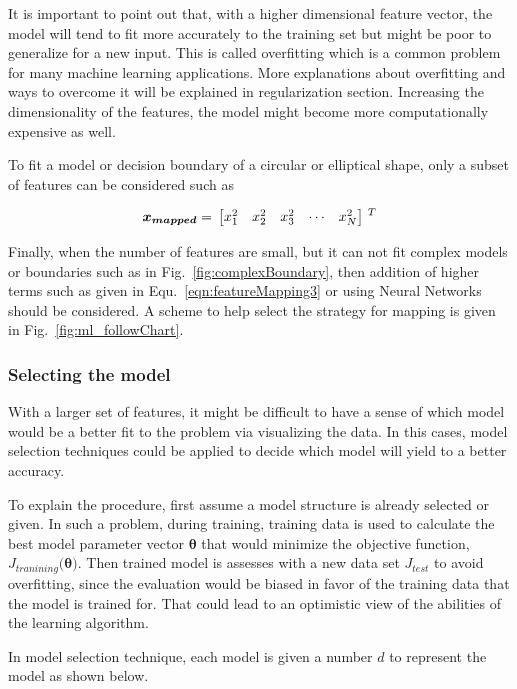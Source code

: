 It is important to point out that, with a higher dimensional feature vector, the model will tend to fit more accurately to the training set but might be poor to generalize for a new input. 
This is called overfitting which is a common problem for many machine learning applications. 
More explanations about overfitting and ways to overcome it will be explained in regularization section. 
Increasing the dimensionality of the features, the model might become more computationally expensive as well.

To fit a model or decision boundary of a circular or elliptical shape, only a subset of features can be considered such as

\begin{equation}{\label{eqn:featureMappin54}}
\bm{x_{mapped}}
=\,
\begin{bmatrix}
x_1^2 & x_2^2 & x_3^2 & \cdots & x_N^2  
\end{bmatrix}
\,^ T
\end{equation} 

Finally, when the number of features are small, but it can not fit complex models or boundaries such as in Fig.~\ref{fig:complexBoundary}, then addition of higher terms such as given in 
Equ.~\ref{eqn:featureMapping3} or using Neural Networks should be considered.
A scheme to help select the strategy for mapping is given in  Fig.~\ref{fig:ml_followChart}. 

\subsubsection{Selecting the model}

With a larger set of features, it might be difficult to have a sense of which model would be a better fit to the problem via visualizing the data. 
In this cases, model selection techniques could be applied to decide which model will yield to a better accuracy.

To explain the procedure, first assume a model structure is already selected or given. 
In such a problem, during training, training data is used to calculate the best model parameter vector $\bm{\theta}$ that would minimize the objective function, $J_{tranining}(\bm{\theta)}$.
Then trained model is assesses with a new data set $J_{test}$ to avoid overfitting, since the evaluation would be biased in favor of the training data that the model is trained for. 
That could lead to an optimistic view of the abilities of the learning algorithm. 

In model selection technique, each model is given a number $d$ to represent the model as shown below.

